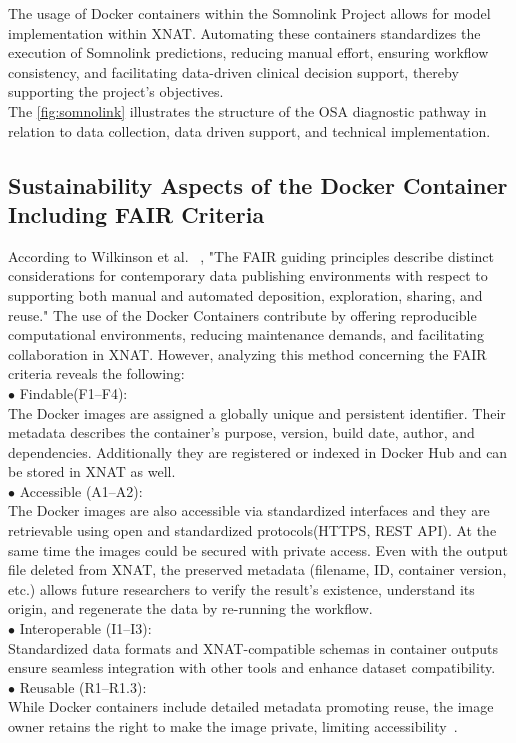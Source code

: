 The usage of Docker containers within the Somnolink Project allows for model implementation within XNAT. Automating these containers standardizes the execution of Somnolink predictions, reducing manual effort, ensuring workflow consistency, and facilitating data-driven clinical decision support, thereby supporting the project's objectives.\\
The \autoref{fig:somnolink} illustrates the structure of the OSA diagnostic pathway in relation to data collection, data driven support, and technical implementation.
\subsection{Sustainability Aspects of the Docker Container Including FAIR Criteria}

According to Wilkinson et al. ~\cite{FAIR}, "The FAIR guiding principles describe distinct considerations for contemporary data publishing environments with respect to supporting both manual and automated deposition, exploration, sharing, and reuse."
The use of the Docker Containers contribute by offering reproducible computational environments, reducing maintenance demands, and facilitating collaboration in XNAT. However, analyzing this method concerning the FAIR criteria reveals the following:\\
$\bullet$ Findable(F1–F4):\\
The Docker images are assigned a globally unique and persistent identifier. Their metadata describes the container’s purpose, version, build date, author, and dependencies. Additionally they are registered or indexed in Docker Hub and can be stored in XNAT as well.\\
$\bullet$ Accessible (A1–A2):\\
The Docker images are also accessible via standardized interfaces and they are retrievable using open and standardized protocols(HTTPS, REST API). At the same time the images could be secured with private access. Even with the output file deleted from XNAT, the preserved metadata (filename, ID, container version, etc.) allows future researchers to verify the result's existence, understand its origin, and regenerate the data by re-running the workflow.\\
$\bullet$ Interoperable (I1–I3): \\
Standardized data formats and XNAT-compatible schemas in container outputs ensure seamless integration with other tools and enhance dataset compatibility.\\
$\bullet$ Reusable (R1–R1.3):\\
While Docker containers include detailed metadata promoting reuse, the image owner retains the right to make the image private, limiting accessibility~\cite{FAIR}.











